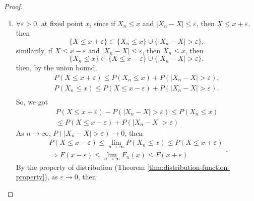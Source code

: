 \begin{proof}
	\begin{enumerate}
		\item $\forall\varepsilon>0$, at fixed point $x$, since if $X_n\leq x$ and $|X_n-X|\leq\varepsilon$, then $X\leq x+\varepsilon$, then
		      \begin{equation*}
			      \{X\leq x+\varepsilon\}\subset\{X_n\leq x\}\cup\{|X_n-X|>\varepsilon\},
		      \end{equation*}
		      similarily, if $X\leq x-\varepsilon$ and $|X_n-X|\leq\varepsilon$, then $X_n\leq x$, then
		      \begin{equation*}
			      \{X_n\leq x\}\subset\{X\leq x-\varepsilon\}\cup\{|X_n-X|>\varepsilon\},
		      \end{equation*}
		      then, by the union bound,
		      \begin{equation*}
			      \begin{gathered}
				      P\left(X\leq x+\varepsilon\right)\leq P\left(X_n\leq x\right)+P\left(|X_n-X|>\varepsilon\right),\\
				      P\left(X_n\leq x\right)\leq P\left(X\leq x-\varepsilon\right)+P\left(|X_n-X|>\varepsilon\right).\\
			      \end{gathered}
		      \end{equation*}
		      So, we got
		      \begin{equation*}
			      \begin{gathered}
				      P\left(X\leq x+\varepsilon\right)-P\left(|X_n-X|>\varepsilon\right)\leq P\left(X_n\leq x\right) \\
				      \leq P\left(X\leq x-\varepsilon\right)+P\left(|X_n-X|>\varepsilon\right)
			      \end{gathered}
		      \end{equation*}
		      As $n\rightarrow\infty$, $P\left(|X_n-X|>\varepsilon\right)\rightarrow 0$, then
		      \begin{equation*}
			      \begin{gathered}
				      P\left(X\leq x-\varepsilon\right)\leq\lim_{n\rightarrow\infty}P\left(X_n\leq x\right)\leq P\left(X\leq x+\varepsilon\right) \\
				      \Rightarrow F(x-\varepsilon)\leq \lim_{n\rightarrow\infty}F_n(x)\leq F(x+\varepsilon)
			      \end{gathered}.
		      \end{equation*}
		      By the property of distribution (Theorem \ref{thm:distribution-function-property}), as $\varepsilon\rightarrow 0$, then

\end{enumerate}
\end{proof}
